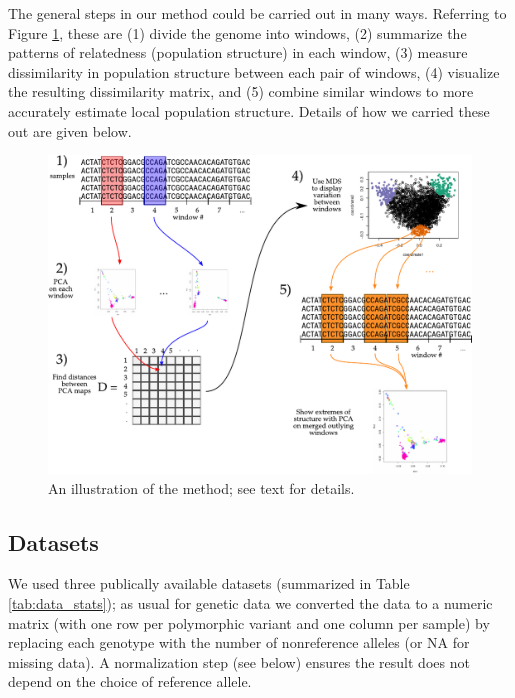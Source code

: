 \documentclass[11pt, oneside]{article}   	%
\begin{document}
The general steps in our method could be carried out in many ways.
Referring to Figure \ref{fig:diagram}, these are
(1) divide the genome into windows,
(2) summarize the patterns of relatedness (population structure) in each window,
(3) measure dissimilarity in population structure between each pair of windows,
(4) visualize the resulting dissimilarity matrix,
and (5) combine similar windows to more accurately estimate local population structure.
Details of how we carried these out are given below.

\begin{figure}
    \begin{center}
       \includegraphics{the-method-diagram}
    \end{center}
    \caption{
         An illustration of the method; see text for details.
         \label{fig:diagram}
    }
\end{figure}



\subsection{Datasets}

We used three publically available datasets (summarized in Table \ref{tab:data_stats});
as usual for genetic data we converted the data to a numeric matrix
(with one row per polymorphic variant and one column per sample)
by replacing each genotype with the number of nonreference alleles
(or NA for missing data).
A normalization step (see below) ensures the result does not depend on the choice of reference allele.
\end{document}
